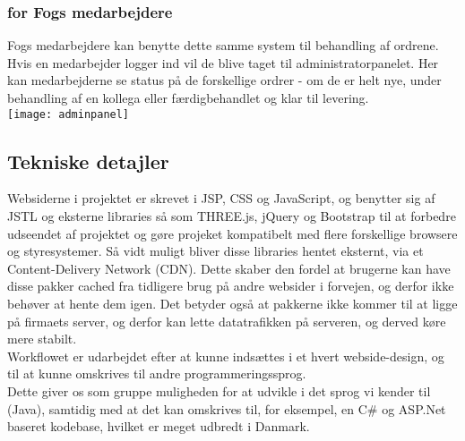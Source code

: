 \subsubsection{for Fogs medarbejdere}
Fogs medarbejdere kan benytte dette samme system til behandling af ordrene. Hvis en medarbejder logger ind vil de blive taget til administratorpanelet. Her kan medarbejderne se status på de forskellige ordrer - om de er helt nye, under behandling af en kollega eller færdigbehandlet og klar til levering.\\
\texttt{[image: adminpanel]}
\subsection{Tekniske detajler}
Websiderne i projektet er skrevet i JSP, CSS og JavaScript, og benytter sig af JSTL og eksterne libraries så som THREE.js, jQuery og Bootstrap til at forbedre udseendet af projektet og gøre projeket kompatibelt med flere forskellige browsere og styresystemer. Så vidt muligt bliver disse libraries hentet eksternt, via et Content-Delivery Network (CDN). Dette skaber den fordel at brugerne kan have disse pakker cached fra tidligere brug på andre websider i forvejen, og derfor ikke behøver at hente dem igen. Det betyder også at pakkerne ikke kommer til at ligge på firmaets server, og derfor kan lette datatrafikken på serveren, og derved køre mere stabilt.\\
Workflowet er udarbejdet efter at kunne indsættes i et hvert webside-design, og til at kunne omskrives til andre programmeringssprog.\\
Dette giver os som gruppe muligheden for at udvikle i det sprog vi kender til (Java), samtidig med at det kan omskrives til, for eksempel, en C\# og ASP.Net baseret kodebase, hvilket er meget udbredt i Danmark.